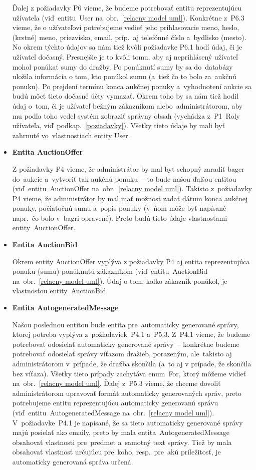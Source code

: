 \begin{itemize}
Ďalej z požiadavky P6 vieme, že budeme potrebovať entitu reprezentujúcu užívateľa (viď~entitu~User na~obr.~\ref{relacny model uml}). Konkrétne z~P6.3 vieme, že o užívateľovi potrebujeme vedieť jeho prihlasovacie meno, heslo, (krstné) meno, priezvisko, email, príp.~aj telefónné číslo a~bydlisko (mesto). No okrem týchto údajov sa nám tiež kvôli požiadavke P6.1 hodí údaj, či je užívateľ dočasný. Presnejšie je to kvôli tomu, aby aj neprihlásený užívateľ mohol ponúkať sumy do dražby. Po ponúknutí sumy by sa do~databázy uložila informácia o tom, kto ponúkol sumu (a~tiež čo to bolo za~aukčnú ponuku). Po prejdení termínu konca aukčnej ponuky a~vyhodnotení aukcie sa budú môcť tieto dočasné účty vymazať. Okrem toho by sa nám tiež hodil údaj o~tom, či je užívateľ bežným zákazníkom alebo~administrátorom, aby mu podľa toho vedel systém zobraziť správny obsah (vychádza z~P1~Roly užívateľa, viď~podkap.~\ref{poziadavky}). Všetky tieto údaje by mali byť zahrnuté vo~vlastnostiach entity User.

\item \textbf{Entita AuctionOffer}

Z požiadavky P4 vieme, že administrátor by mal byt schopný zaradiť bager do~aukcie a~vytvoriť tak aukčnú ponuku~-- to bude našou ďalšou entitou (viď~entitu~AuctionOffer na~obr.~\ref{relacny model uml}). Takisto z~požiadavky P4 vieme, že administrátor by mal mať možnosť zadať dátum konca aukčnej ponuky, počiatočnú sumu a~popis ponuky (v~ňom môže byť napísané napr.~čo bolo v~bagri opravené). Preto budú tieto údaje vlastnosťami entity~AuctionOffer.

\item \textbf{Entita AuctionBid}

Okrem entity AuctionOffer vyplýva z požiadavky P4 aj entita reprezentujúca ponuku (sumu) ponúknutú zákazníkom (viď~entitu~AuctionBid na~obr.~\ref{relacny model uml}). Údaj o tom, koľko zákazník ponúkol, je vlastnosťou entity~AuctionBid.

\item \textbf{Entita AutogeneratedMessage}

Našou poslednou entitou bude entita pre~automaticky generované správy, ktorej potreba vyplýva z~požiadaviek~P4.1 a~P5.3. Z~P4.1 vieme, že budeme potrebovať odosielať automaticky generované správy~-- konkrétne budeme potrebovať odosielať správy víťazom dražieb, porazeným, ale~takisto aj administrátorom v~prípade, že dražba skončila (a~to aj v prípade, že skončila bez víťaza). Všetky tieto prípady zachytáva enum~For, ktorý môžeme vidieť na~obr.~\ref{relacny model uml}. Ďalej z~P5.3 vieme, že chceme dovoliť administrátorom upravovať formát automaticky generovaných správ, preto potrebujeme entitu reprezentujúcu automaticky generovanú správu (viď~entitu~AutogeneratedMessage na~obr.~\ref{relacny model uml}). V~požiadavke~P4.1 je napísané, že sa tieto automaticky generované správy majú posielať ako emaily, preto by mala entita~AutogeneratedMessage obsahovať vlastnosti pre~predmet a~samotný text správy. Tiež by mala obsahovať vlastnosť určujúcu pre~koho, resp.~pre~akú príležitosť, je automaticky generovaná správa určená.

\end{itemize}

